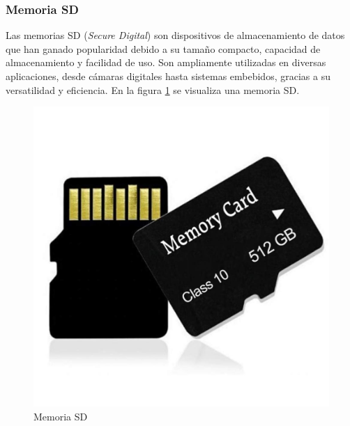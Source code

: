 \subsubsection{Memoria SD}

Las memorias SD (\textit{Secure Digital}) son dispositivos de almacenamiento de datos que han ganado popularidad debido a su tamaño compacto, capacidad de almacenamiento y facilidad de uso. Son ampliamente utilizadas en diversas aplicaciones, desde cámaras digitales hasta sistemas embebidos, gracias a su versatilidad y eficiencia. En la figura \ref{fig:sd_card} se visualiza una memoria SD.\\


\begin{figure}[H]
    \centering
    \includegraphics[scale = 0.2]{img/sd_card.jpg}
    \caption{Memoria SD}
    \label{fig:sd_card}
\end{figure}



